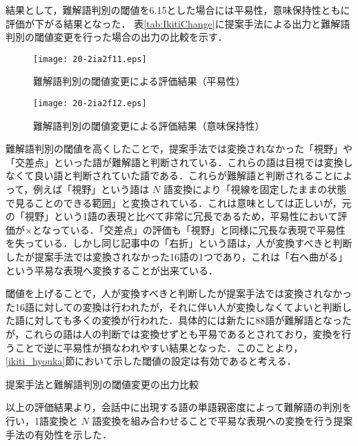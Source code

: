 \documentclass[japanese]{jnlp_1.4}
\begin{document}
結果として，難解語判別の閾値を6.15とした場合には平易性，意味保持性ともに評価が下がる結果となった．
表\ref{tab:IkitiChange}に提案手法による出力と難解語判別の閾値変更を行った場合の出力の比較を示す．

\begin{figure}[t]
 \begin{center}
  \texttt{[image: 20-2ia2f11.eps]}
 \end{center}
 \caption{難解語判別の閾値変更による評価結果（平易性）}
 \label{fig:hyoukananhen1}
\end{figure}
\begin{figure}[t]
 \begin{center}
  \texttt{[image: 20-2ia2f12.eps]}
 \end{center}
 \caption{難解語判別の閾値変更による評価結果（意味保持性）}
 \label{fig:hyoukananhen2}
\end{figure}

難解語判別の閾値を高くしたことで，提案手法では変換されなかった「視野」や「交差点」といった語が難解語と判断されている．これらの語は目視では変換しなくて良い語と判断されていた語である．これらが難解語と判断されることによって，例えば「視野」という語は $N$ 語変換により「視線を固定したままの状態で見ることのできる範囲」と変換されている．これは意味としては正しいが，元の「視野」という1語の表現と比べて非常に冗長であるため，平易性において評価が×となっている．「交差点」の評価も「視野」と同様に冗長な表現で平易性を失っている．しかし同じ記事中の「右折」という語は，人が変換すべきと判断したが提案手法では変換されなかった16語の1つであり，これは「右へ曲がる」という平易な表現へ変換することが出来ている．

閾値を上げることで，人が変換すべきと判断したが提案手法では変換されなかった16語に対しての変換は行われたが，それに伴い人が変換しなくてよいと判断した語に対しても多くの変換が行われた．具体的には新たに88語が難解語となったが，これらの語は人の判断では変換せずとも平易であるとされており，変換を行うことで逆に平易性が損なわれやすい結果となった．このことより，\ref{ikiti_hyouka}節において示した閾値の設定は有効であると考える．

\begin{table}[t]
\caption{提案手法と難解語判別の閾値変更の出力比較}
\label{tab:IkitiChange}

\end{table}

以上の評価結果より，会話中に出現する語の単語親密度によって難解語の判別を行い，1語変換と $N$ 語変換を組み合わせることで平易な表現への変換を行う提案手法の有効性を示した．
\end{document}
